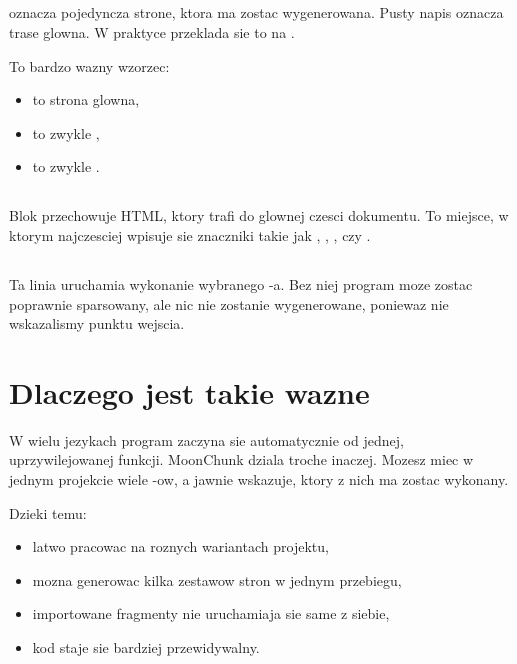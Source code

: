 \subsection*{}
 oznacza pojedyncza strone, ktora ma zostac wygenerowana. Pusty napis
 oznacza trase glowna. W praktyce przeklada sie to na .

To bardzo wazny wzorzec:

\begin{itemize}
  \item {} to strona glowna,
  \item {} to zwykle ,
  \item {} to zwykle .
\end{itemize}

\subsection*{}
Blok  przechowuje HTML, ktory trafi do glownej czesci dokumentu.
To miejsce, w ktorym najczesciej wpisuje sie znaczniki takie jak , ,
,  czy .

\subsection*{}
Ta linia uruchamia wykonanie wybranego -a. Bez niej program moze zostac
poprawnie sparsowany, ale nic nie zostanie wygenerowane, poniewaz nie wskazalismy
punktu wejscia.

\section{Dlaczego  jest takie wazne}
W wielu jezykach program zaczyna sie automatycznie od jednej, uprzywilejowanej funkcji.
MoonChunk dziala troche inaczej. Mozesz miec w jednym projekcie wiele -ow,
a  jawnie wskazuje, ktory z nich ma zostac wykonany.

Dzieki temu:

\begin{itemize}
  \item latwo pracowac na roznych wariantach projektu,
  \item mozna generowac kilka zestawow stron w jednym przebiegu,
  \item importowane fragmenty nie uruchamiaja sie same z siebie,
  \item kod staje sie bardziej przewidywalny.
\end{itemize}

